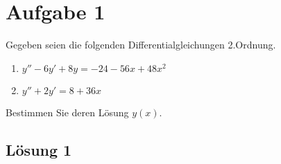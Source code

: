 \documentclass[main.tex]{subfiles}
\begin{document}
\section{Aufgabe 1}
Gegeben seien die folgenden Differentialgleichungen 2.Ordnung.
\begin{enumerate}
    \item $y'' - 6y' + 8y = -24 -56x + 48x^2$
    \item $y'' + 2y' = 8 + 36x$
\end{enumerate}
Bestimmen Sie deren Lösung $y(x)$.

\subsection{Lösung 1}
\end{document}

